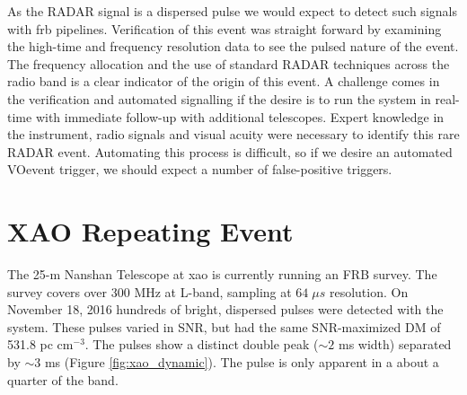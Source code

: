 \documentclass[a4paper,fleqn,usenatbib]{mnras}
\begin{document}
As the RADAR signal is a dispersed pulse we would expect to detect such signals
with \gls{frb} pipelines.  Verification of this event was straight forward by
examining the high-time and frequency resolution data to see the pulsed nature
of the event.  The frequency allocation and the use of standard RADAR techniques
across the radio band is a clear indicator of the origin of this event.  A
challenge comes in the verification and automated signalling if the desire is to
run the system in real-time with immediate follow-up with additional telescopes.
Expert knowledge in the instrument, radio signals and visual acuity were
necessary to identify this rare RADAR event.  Automating this process is
difficult, so if we desire an automated VOevent trigger, we should expect a
number of false-positive triggers.

\section{XAO Repeating Event}
\label{sec:xao_event}


The 25-m Nanshan Telescope at \gls{xao} is currently running an FRB survey. The
survey covers over 300 MHz at L-band, sampling at $64 \; \mu s$ resolution. On
November 18, 2016 hundreds of bright, dispersed pulses were detected with the
system. These pulses varied in SNR, but had the same SNR-maximized DM of 531.8
pc cm$^{-3}$. The pulses show a distinct double peak ($\sim 2$ ms width)
separated by $\sim 3$ ms (Figure \ref{fig:xao_dynamic}). The pulse is only
apparent in a about a quarter of the band.
\end{document}
